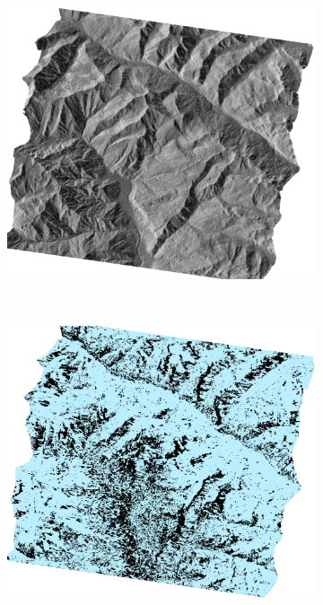 \begin{figure}
\begin{subfigure}[b]{0.45\columnwidth}
\includegraphics[width=\textwidth]{Figures/SnowCover2018/IncAng2}
\caption{}
\end{subfigure}
~
\begin{subfigure}[b]{0.45\columnwidth}
\includegraphics[width=\textwidth]{Figures/SnowCover2018/Hyb}
\caption{}
\end{subfigure}
~
\begin{subfigure}[b]{0.45\columnwidth}

\end{subfigure}
\end{figure}
